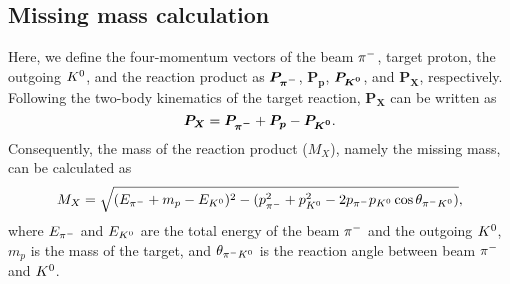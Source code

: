 \subsection{Missing mass calculation}
\label{sec-mmcalc_anaflow}

Here, we define the four-momentum vectors of the beam $\pi^{-}$, target proton, the outgoing $K^{0}$, and the reaction product as $\bm{P_{\pi^{-}}}$, $\bm{P_{p}}$, $\bm{P_{K^{0}}}$, and $\bm{P_X}$, respectively. Following the two-body kinematics of the target reaction, $\bm{P_X}$ can be written as 
\begin{equation}
  \bm{P_X} = \bm{P_{\pi^{-}}} + \bm{P_{p}} - \bm{P_{K^{0}}}. 
  \label{eq-mmom_lam}
\end{equation}
Consequently, the mass of the reaction product ($M_X$), namely the missing mass, can be calculated as
\begin{equation}
  M_X = \sqrt{ (E_{\pi^{-}} + m_p - E_{K^{0}})^2 - (p_{\pi^{-}}^2 + p_{K^{0}}^2 - 2p_{\pi^{-}}p_{K^{0}}\cos{\theta_{\pi^{-}K^{0}}}) },
  \label{eq-mm_lam}
\end{equation}
where $E_{\pi^{-}}$ and $E_{K^{0}}$ are the total energy of the beam $\pi^{-}$ and the outgoing $K^{0}$, $m_p$ is the mass of the target, and $\theta_{\pi^{-}K^{0}}$ is the reaction angle between beam $\pi^{-}$ and $K^{0}$. 


